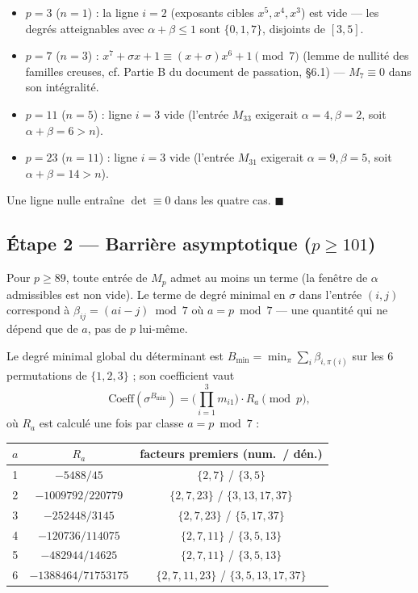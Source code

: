 \documentclass[12pt,a4paper]{article}
\theoremstyle{definition}
\begin{document}
\begin{itemize}
\item $p=3$ ($n=1$) : la ligne $i=2$ (exposants cibles $x^5,x^4,x^3$) est vide — les degrés atteignables avec $\alpha+\beta\le1$ sont $\{0,1,7\}$, disjoints de $[3,5]$.
\item $p=7$ ($n=3$) : $x^7+\sigma x+1\equiv(x+\sigma)x^6+1\pmod7$ (lemme de nullité des familles creuses, cf. Partie B du document de passation, §6.1) — $M_7\equiv0$ dans son intégralité.
\item $p=11$ ($n=5$) : ligne $i=3$ vide (l'entrée $M_{33}$ exigerait $\alpha=4,\beta=2$, soit $\alpha+\beta=6>n$).
\item $p=23$ ($n=11$) : ligne $i=3$ vide (l'entrée $M_{31}$ exigerait $\alpha=9,\beta=5$, soit $\alpha+\beta=14>n$).
\end{itemize}
Une ligne nulle entraîne $\det\equiv0$ dans les quatre cas. $\blacksquare$

\subsection{Étape 2 — Barrière asymptotique ($p\ge101$)}

Pour $p\ge89$, toute entrée de $M_p$ admet au moins un terme (la fenêtre de $\alpha$ admissibles est non vide). Le terme de degré minimal en $\sigma$ dans l'entrée $(i,j)$ correspond à $\beta_{ij}=(ai-j)\bmod7$ où $a=p\bmod7$ — une quantité qui ne dépend que de $a$, pas de $p$ lui-même.

Le degré minimal global du déterminant est $B_{\min}=\min_\pi\sum_i\beta_{i,\pi(i)}$ sur les 6 permutations de $\{1,2,3\}$ ; son coefficient vaut
\[
\mathrm{Coeff}(\sigma^{B_{\min}})=\Big(\prod_{i=1}^3 m_{i1}\Big)\cdot R_a\pmod p,
\]
où $R_a$ est calculé une fois par classe $a=p\bmod7$ :

\begin{center}
\begin{tabular}{ccc}
\toprule
$a$ & $R_a$ & facteurs premiers (num.\ / dén.) \\
\midrule
1 & $-5488/45$ & $\{2,7\}$ / $\{3,5\}$ \\
2 & $-1009792/220779$ & $\{2,7,23\}$ / $\{3,13,17,37\}$ \\
3 & $-252448/3145$ & $\{2,7,23\}$ / $\{5,17,37\}$ \\
4 & $-120736/114075$ & $\{2,7,11\}$ / $\{3,5,13\}$ \\
5 & $-482944/14625$ & $\{2,7,11\}$ / $\{3,5,13\}$ \\
6 & $-1388464/71753175$ & $\{2,7,11,23\}$ / $\{3,5,13,17,37\}$ \\
\bottomrule
\end{tabular}
\end{center}
\end{document}
